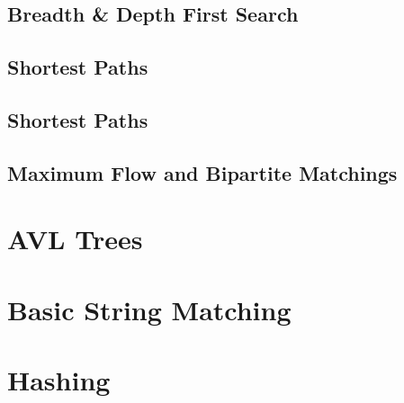 \documentclass[10pt]{article}
\begin{document}
\subsection{Breadth \& Depth First Search}

\subsection{Shortest Paths}

\subsection{Shortest Paths}

\subsection{Maximum Flow and Bipartite Matchings}

\section{AVL Trees}

\section{Basic String Matching}

\section{Hashing}








\newpage
\end{document}
